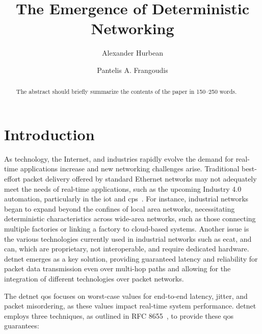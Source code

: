 \documentclass[runningheads]{llncs}
\begin{document}
\title{The Emergence of Deterministic Networking}
\author{Alexander Hurbean \and
  Pantelis A. Frangoudis}

\maketitle              %

\begin{abstract}
  The abstract should briefly summarize the contents of the paper in
  150--250 words.
  
\end{abstract}

\section{Introduction}

As technology, the Internet, and industries rapidly evolve the demand for real-time applications increase and new networking challenges arise. Traditional best-effort packet delivery offered by standard Ethernet networks may not adequately meet the needs of real-time applications, such as the upcoming Industry 4.0 automation, particularly in the \gls{iot} and \gls{cps}~\cite{Wollschlaeger2017}. For instance, industrial networks began to expand beyond the confines of local area networks, necessitating deterministic characteristics across wide-area networks, such as those connecting multiple factories or linking a factory to cloud-based systems. Another issue is the various technologies currently used in industrial networks such as \gls{ecat}, and \gls{can}, which are proprietary, not interoperable, and require dedicated hardware. \gls{detnet} emerges as a key solution, providing guaranteed latency and reliability for packet data transmission even over multi-hop paths and allowing for the integration of different technologies over packet networks.

The \gls{detnet} \gls{qos} focuses on worst-case values for end-to-end latency, jitter, and packet misordering, as these values impact real-time system performance. \gls{detnet} employs three techniques, as outlined in RFC 8655~\cite{rfc8655}, to provide these \gls{qos} guarantees:
\end{document}
